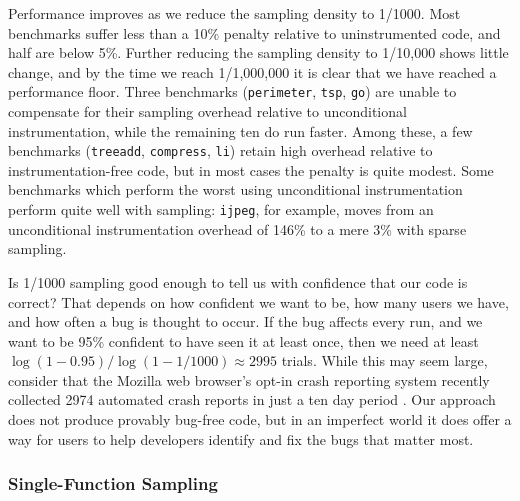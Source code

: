 Performance improves as we reduce the sampling density to 1/1000.
Most benchmarks suffer less than a 10\% penalty relative to
uninstrumented code, and half are below 5\%.  Further reducing the
sampling density to 1/10,000 shows little change, and by the time we
reach 1/1,000,000 it is clear that we have reached a performance
floor.  Three benchmarks (\texttt{perimeter}, \texttt{tsp},
\texttt{go}) are unable to compensate for their sampling overhead
relative to unconditional instrumentation, while the remaining ten do
run faster.  Among these, a few benchmarks (\texttt{treeadd},
\texttt{compress}, \texttt{li}) retain high overhead relative to
instrumentation-free code, but in most cases the penalty is quite
modest.  Some benchmarks which perform the worst using unconditional
instrumentation perform quite well with sampling: \texttt{ijpeg}, for
example, moves from an unconditional instrumentation overhead of 146\%
to a mere 3\% with sparse sampling.

Is 1/1000 sampling good enough to tell us with confidence that our
code is correct?  That depends on how confident we want to be, how
many users we have, and how often a bug is thought to occur.  If the
bug affects every run, and we want to be 95\% confident to have seen
it at least once, then we need at least $\log{(1-0.95)} /
\log{(1-1/1000)} \approx 2995$ trials.  While this may seem large, consider
that the Mozilla web browser's opt-in crash reporting system recently
collected 2974 automated crash reports in just a ten day period
\cite{Mozilla:1-4-2003:crash-data}.  Our approach does not produce
provably bug-free code, but in an imperfect world it does offer a way
for users to help developers identify and fix the bugs that matter
most.


\subsubsection{Single-Function Sampling}




